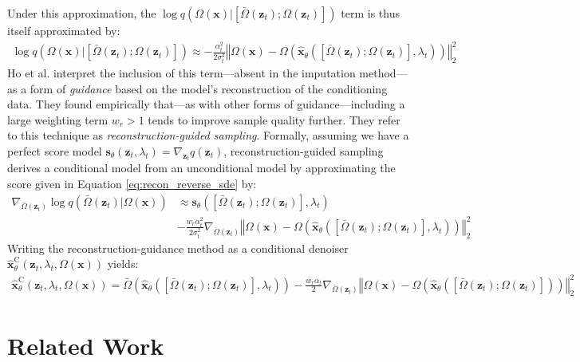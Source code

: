 \documentclass[ oneside,%
                    author={George Herbert},
                    degree={MSci},
                     title={Diffusion Models for Time-Evolving Precipitation Fields},
                  subtitle={}]{dissertation}
\begin{document}
Under this approximation, the $\log q(\Omega(\mathbf{x})|[\bar\Omega(\mathbf{z}_t); \Omega(\mathbf{z}_t)])$ term is thus itself approximated by:
\begin{align}
      \log q(\Omega(\mathbf{x})|[\bar\Omega(\mathbf{z}_t); \Omega(\mathbf{z}_t)])\approx-\frac{\alpha_t^2}{2\sigma_t^2} \left\Vert \Omega(\mathbf{x}) - \Omega\left(\hat{\mathbf{x}}_\theta\left([\bar\Omega(\mathbf{z}_t); \Omega(\mathbf{z}_t)], \lambda_t \right)\right)\right\Vert_2^2
\end{align}
Ho et al. \cite{VDM_Ho} interpret the inclusion of this term---absent in the imputation method---as a form of \textit{guidance} based on the model's reconstruction of the conditioning data. They found empirically that---as with other forms of guidance---including a large weighting term $w_r>1$ tends to improve sample quality further. They refer to this technique as \textit{reconstruction-guided sampling}. Formally, assuming we have a perfect score model $\mathbf{s}_\theta(\mathbf{z}_t, \lambda_t)=\nabla_{\mathbf{z}_t} q(\mathbf{z}_t)$, reconstruction-guided sampling derives a conditional model from an unconditional model by approximating the score given in Equation \ref{eq:recon_reverse_sde} by:
\begin{align}
      \nabla_{\bar\Omega(\mathbf{z}_t)}\log q(\bar\Omega(\mathbf{z}_t)|\Omega(\mathbf{x}))&\approx \mathbf{s}_\theta ([\bar\Omega(\mathbf{z}_t); \Omega(\mathbf{z}_t)], \lambda_t)\\&-\frac{w_r\alpha_t^2}{2\sigma_t^2}\nabla_{\bar\Omega(\mathbf{z}_t)} \left\Vert \Omega(\mathbf{x}) - \Omega\left(\hat{\mathbf{x}}_\theta\left([\bar\Omega(\mathbf{z}_t); \Omega(\mathbf{z}_t)], \lambda_t \right)\right)\right\Vert_2^2
\end{align}
Writing the reconstruction-guidance method as a conditional denoiser $\hat{\mathbf{x}}^{\mathrm{C}}_\theta(\mathbf{z}_t, \lambda_t, \Omega(\mathbf{x}))$ yields:
\begin{align}
      \hat{\mathbf{x}}^{\mathrm{C}}_\theta(\mathbf{z}_t, \lambda_t, \Omega(\mathbf{x}))=\bar\Omega\left(\hat{\mathbf{x}}_\theta([\bar\Omega(\mathbf{z}_t); \Omega(\mathbf{z}_t)], \lambda_t )\right) - \frac{w_r\alpha_t}{2}\nabla_{\bar\Omega(\mathbf{z}_t)} \left\Vert \Omega(\mathbf{x}) - \Omega\left(\hat{\mathbf{x}}_\theta\left([\bar\Omega(\mathbf{z}_t); \Omega(\mathbf{z}_t)]\right)\right)\right\Vert_2^2
\end{align}

\chapter{Related Work}
\label{chap:background_climate}
\end{document}
